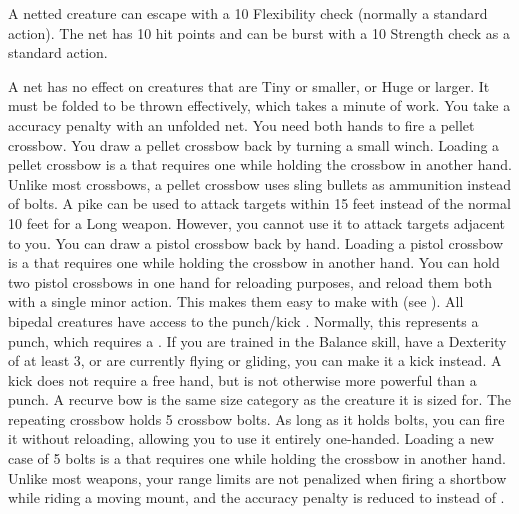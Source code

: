     \par A netted creature can escape with a  10 Flexibility check (normally a standard action). The net has 10 hit points and can be burst with a  10 Strength check as a standard action.
    \par A net has no effect on creatures that are Tiny or smaller, or Huge or larger. It must be folded to be thrown effectively, which takes a minute of work. You take a  accuracy penalty with an unfolded net.
     You need both hands to fire a pellet crossbow.
    You draw a pellet crossbow back by turning a small winch.
    Loading a pellet crossbow is a  that requires one  while holding the crossbow in another hand.
    Unlike most crossbows, a pellet crossbow uses sling bullets as ammunition instead of bolts.
     A pike can be used to attack targets within 15 feet instead of the normal 10 feet for a Long weapon.
    However, you cannot use it to attack targets adjacent to you.
     You can draw a pistol crossbow back by hand.
    Loading a pistol crossbow is a  that requires one  while holding the crossbow in another hand.
    You can hold two pistol crossbows in one hand for reloading purposes, and reload them both with a single minor action.
    This makes them easy to make  with (see ).
     All bipedal creatures have access to the punch/kick .
    Normally, this represents a punch, which requires a .
    If you are trained in the Balance skill, have a Dexterity of at least 3, or are currently flying or gliding, you can make it a kick instead.
    A kick does not require a free hand, but is not otherwise more powerful than a punch.
     A recurve bow is the same size category as the creature it is sized for.
     The repeating crossbow holds 5 crossbow bolts.
    As long as it holds bolts, you can fire it without reloading, allowing you to use it entirely one-handed.
    Loading a new case of 5 bolts is a  that requires one  while holding the crossbow in another hand.
     Unlike most  weapons, your range limits are not penalized when firing a shortbow while riding a moving mount, and the accuracy penalty is reduced to  instead of .
